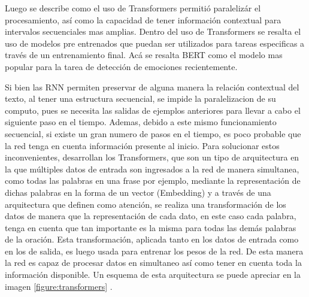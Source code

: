  Luego se describe como el uso de Transformers permitió paralelizár el procesamiento, así como la capacidad de tener información contextual para intervalos secuenciales mas amplias. Dentro del uso de Transformers se resalta el uso de modelos pre entrenados que puedan ser utilizados para tareas especificas a través de un entrenamiento final. Acá se resalta BERT como el modelo mas popular para la tarea de detección de emociones recientemente.







Si bien las RNN permiten preservar de alguna manera la relación contextual del texto, al tener una estructura secuencial, se impide la paralelizacion de su computo, pues se necesita las salidas de ejemplos anteriores para llevar a cabo el siguiente paso en el tiempo. Ademas, debido a este mismo funcionamiento secuencial, si existe un gran numero de pasos en el tiempo, es poco probable que la red tenga en cuenta información presente al inicio. Para solucionar estos inconvenientes, \cite{vaswani2017attention} desarrollan los Transformers, que son un tipo de arquitectura en la que múltiples datos de entrada son ingresados a la red de manera simultanea, como todas las palabras en una frase por ejemplo, mediante la representación de dichas palabras en la forma de un vector (Embedding) y a través de una arquitectura que definen como atención, se realiza una transformación de los datos de manera que la representación de cada dato, en este caso cada palabra, tenga en cuenta que tan importante es la misma para todas las demás palabras de la oración. Esta transformación, aplicada tanto en los datos de entrada como en los de salida, es luego usada para entrenar los pesos de la red. De esta manera la red es capaz de procesar datos en simultaneo así como tener en cuenta toda la información disponible. Un esquema de esta arquitectura se puede apreciar en la imagen \ref{figure:transformers} \cite{vaswani2017attention}.

